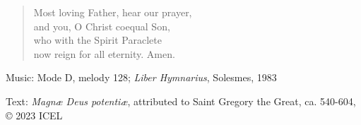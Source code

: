 \hymn



\setlength{\leftmargini}{2em}
\begin{verse}
Most loving Father, hear our prayer,\\
and you, O Christ coequal Son,\\
who with the Spirit Paraclete\\
now reign for all eternity. Amen.
\end{verse}
\setlength{\leftmargini}{\defleftmargini}

\begin{hymnsource}
Music: Mode D, melody 128; \emph{Liber Hymnarius}, Solesmes, 1983

Text: \emph{Magnæ Deus potentiæ}, attributed to Saint Gregory the Great, ca. 540-604, © 2023 ICEL
\end{hymnsource}

